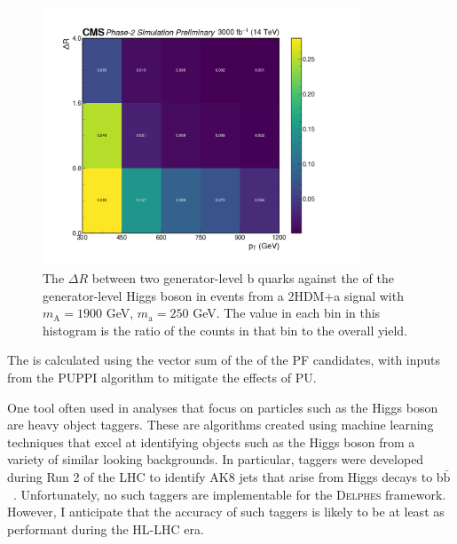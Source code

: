 \begin{figure}[ht]
\centering
\includegraphics[width=0.845\textwidth]{Chapters/Strategy/b_DeltaR_vs_h_pt.png}
\caption{The $\Delta R$ between two generator-level b quarks against the \pt of the generator-level Higgs boson in events from a 2HDM+a signal with $m_\mathrm{A} = 1900$ GeV, $m_\mathrm{a} = 250$ GeV. The value in each bin in this histogram is the ratio of the counts in that bin to the overall yield.}
\label{fig:deltaRvspt}
\end{figure}

The \ptvecmiss is calculated using the vector sum of the \pt of the PF candidates, with inputs from the PUPPI algorithm to mitigate the effects of PU.

One tool often used in analyses that focus on particles such as the Higgs boson are heavy object taggers. These are algorithms created using machine learning techniques that excel at identifying objects such as the Higgs boson from a variety of similar looking backgrounds. In particular, taggers were developed during Run 2 of the LHC to identify AK8 jets that arise from Higgs decays to b$\bar{\mathrm{b}}$~\cite{CMS:2020mlt, Qu_2020}. Unfortunately, no such taggers are implementable for the \textsc{Delphes} framework. However, I anticipate that the accuracy of such taggers is likely to be at least as performant during the HL-LHC era.

